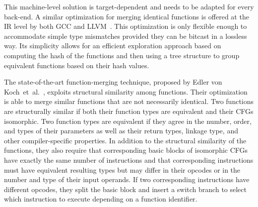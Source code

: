 This machine-level solution is target-dependent and needs to be adapted for every back-end.
A similar optimization for merging identical functions %
is offered at the IR level by both GCC and LLVM~\cite{llvm-fm,livska14}.
This optimization is only flexible enough to accommodate simple type mismatches
provided they can be bitcast in a lossless way.
Its simplicity allows for an efficient exploration approach based on computing
the hash of the functions and then using a tree structure to group equivalent
functions based on their hash values.

The state-of-the-art function-merging technique, proposed by Edler von
Koch~et~al.~\cite{edler14}, exploits structural similarity among functions.
Their optimization is able to merge similar functions that are not necessarily
identical.
Two functions are structurally similar if both their function types are equivalent
and their CFGs isomorphic.
Two function types are equivalent if they agree in the number, order, and types of their parameters as well as
their return types, linkage type, and other compiler-specific properties.
In addition to the structural similarity of the functions, they also require
that corresponding basic blocks of isomorphic CFGs have exactly the same number
of instructions and that corresponding instructions must have equivalent
resulting types but may differ in their opcodes or in the number and type of
their input operands.
If two corresponding instructions have different opcodes, they split the basic
block and insert a switch branch to select which instruction to execute
depending on a function identifier.

